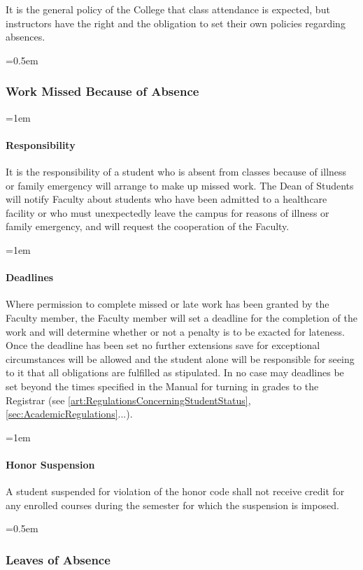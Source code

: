 \documentclass{manual}
\let\oldsubsubsection\subsubsection
\renewcommand\subsubsection{\leftskip=0.5em\oldsubsubsection}
\let\oldparagraph\paragraph
\renewcommand\paragraph{\leftskip=1em\oldparagraph}
\begin{document}
It is the general policy of the College that class attendance is expected, but instructors have the right and the obligation to set their own policies regarding absences.

\subsubsection{Work Missed Because of Absence}

\paragraph{Responsibility}
It is the responsibility of a student who is absent from classes because of illness or family emergency will arrange to make up missed work. The Dean of Students will notify Faculty about students who have been admitted to a healthcare facility or who must unexpectedly leave the campus for reasons of illness or family emergency, and will request the cooperation of the Faculty.

\paragraph{Deadlines}
Where permission to complete missed or late work has been granted by the Faculty member, the Faculty member will set a deadline for the completion of the work and will determine whether or not a penalty is to be exacted for lateness. Once the deadline has been set no further extensions save for exceptional circumstances will be allowed and the student alone will be responsible for seeing to it that all obligations are fulfilled as stipulated. In no case may deadlines be set beyond the times specified in the Manual for turning in grades to the Registrar (see \cref{art:RegulationsConcerningStudentStatus}, \cref{sec:AcademicRegulations}...).

\paragraph{Honor Suspension}
A student suspended for violation of the honor code shall not receive credit for any enrolled courses during the semester for which the suspension is imposed.

\subsubsection{Leaves of Absence}
\end{document}
